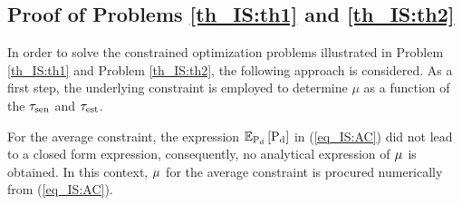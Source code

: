 {\subsection{Proof of Problems \ref{th_IS:th1} and \ref{th_IS:th2}} \label{ssec:th1} 
\begin{IEEEproof} 
In order to solve the constrained optimization problems illustrated in Problem \ref{th_IS:th1} and Problem \ref{th_IS:th2}, the following approach is considered. As a first step, the underlying constraint is employed to determine $\mu$ as a function of the $\tau_{\text{sen}}$ and $\tau_{\text{est}}$. %

For the average constraint, the expression ${\mathbb E}_{\text{P}_{\text{d}}}\left[ \text{P}_{\text{d}} \right]$ in (\ref{eq_IS:AC}) did not lead to a closed form expression, consequently, no analytical expression of $\mu^{\text{}}$ is obtained. In this context, $\mu^{\text{}}$ for the average constraint is procured numerically from (\ref{eq_IS:AC}). 


\end{IEEEproof}}
